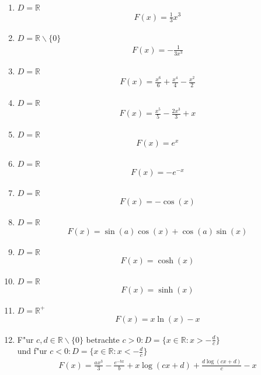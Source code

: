 \documentclass[11pt,answers]{exam}
\begin{document}
\begin{questions}
\begin{solution}
\begin{enumerate}
\item $D=\mathbb{R}$
\begin{align*}
F(x)=\frac{1}{3}x^3
\end{align*}
\item $D=\mathbb{R}\backslash\{0\}$
\begin{align*}
F(x)=-\frac{1}{3x^3}
\end{align*}
\item $D=\mathbb{R}$
\begin{align*}
F(x)=\frac{x^6}{6}+\frac{x^4}{4}-\frac{x^2}{2}
\end{align*}
\item $D=\mathbb{R}$
\begin{align*}
F(x)=\frac{x^5}{5}-\frac{2 x^3}{3}+x
\end{align*}
\item $D=\mathbb{R}$
\begin{align*}
F(x)=e^x
\end{align*}
\item $D=\mathbb{R}$
\begin{align*}
F(x)=-e^{-x}
\end{align*}
\item $D=\mathbb{R}$
\begin{align*}
F(x)=-\cos(x)
\end{align*}
\item $D=\mathbb{R}$
\begin{align*}
F(x)=\sin (a) \cos (x)+\cos (a) \sin (x)
\end{align*}
\item $D=\mathbb{R}$
\begin{align*}
F(x)=\cosh(x)
\end{align*}
\item $D=\mathbb{R}$
\begin{align*}
F(x)=\sinh(x)
\end{align*}
\item $D=\mathbb{R}^+$
\begin{align*}
F(x)=x\ln(x)-x
\end{align*}
\item F"ur $c,d\in\mathbb{R}\backslash\{0\}$ betrachte $c>0:D=\{x\in\mathbb{R}:x>-\frac{d}{c}\}$ \\ und f"ur 
$c<0:D=\{x\in\mathbb{R}:x<-\frac{d}{c}\}$
\begin{align*}
F(x)=\frac{a x^3}{3}-\frac{e^{-b x}}{b}+x \log (c x+d)+\frac{d \log (c x+d)}{c}-x
\end{align*}

\end{enumerate}
\end{solution}
\end{questions}
\end{document}

